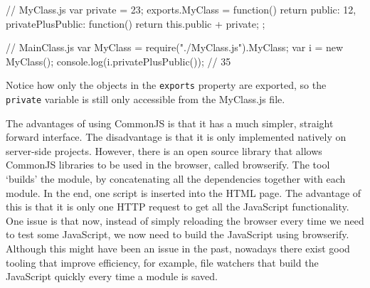 \begin{code}
// MyClass.js
var private = 23;
exports.MyClass = function(){
  return {
    public: 12,
    privatePlusPublic: function(){
      return this.public + private;
    }
  }
};

// MainClass.js
var MyClass = require("./MyClass.js").MyClass;
var i = new MyClass();
console.log(i.privatePlusPublic()); // 35
\end{code}

Notice how only the objects in the \lstinline{exports} property are exported, so the \lstinline{private} variable is still only accessible from the MyClass.js file.

The advantages of using CommonJS is that it has a much simpler, straight forward interface. The disadvantage is that it is only implemented natively on server-side projects. However, there is an open source library that allows CommonJS libraries to be used in the browser, called browserify. The tool `builds' the module, by concatenating all the dependencies together with each module. In the end, one script is inserted into the HTML page. The advantage of this is that it is only one HTTP request to get all the JavaScript functionality. One issue is that now, instead of simply reloading the browser every time we need to test some JavaScript, we now need to build the JavaScript using browserify. Although this might have been an issue in the past, nowadays there exist good tooling that improve efficiency, for example, file watchers that build the JavaScript quickly every time a module is saved.



